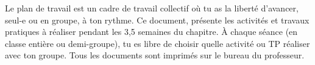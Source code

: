 \tetePremStssBiol

\vspace*{-8pt}

\begin{importants}
  Le plan de travail est un cadre de travail collectif où tu as la liberté d'avancer, seul-e ou en groupe, à ton rythme.  
  Ce document,  présente les activités et travaux pratiques à réaliser pendant les 3,5 semaines du chapitre.
  À chaque séance (en classe entière ou demi-groupe), tu es libre de choisir quelle activité ou TP réaliser avec ton groupe.
  Tous les documents sont imprimés sur le bureau du professeur.
\end{importants}


\vspace*{-16pt}

